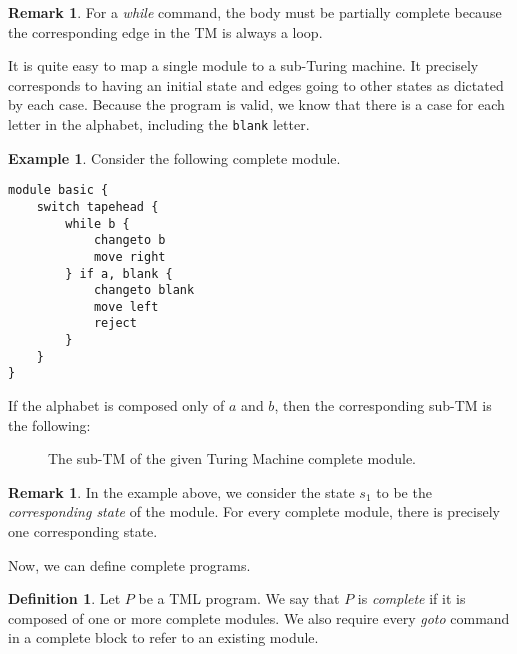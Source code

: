 \documentclass{article}
\theoremstyle{definition}
\newtheorem{definition}[rules]{Definition}
\newtheorem{remark}[rules]{Remark}
\newtheorem{example}[rules]{Example}
\theoremstyle{plain}
\begin{document}
\begin{remark}
    For a \textit{while} command, the body must be partially complete because the corresponding edge in the TM is always a loop.
\end{remark}

It is quite easy to map a single module to a sub-Turing machine. It precisely corresponds to having an initial state and edges going to other states as dictated by each case. Because the program is valid, we know that there is a case for each letter in the alphabet, including the \texttt{blank} letter.
\begin{example}
    Consider the following complete module.
\begin{lstlisting}[language=TML]
module basic {
    switch tapehead {
        while b {
            changeto b
            move right
        } if a, blank {
            changeto blank
            move left
            reject
        }
    }
}
\end{lstlisting}
If the alphabet is composed only of $a$ and $b$, then the corresponding sub-TM is the following:
\begin{figure}[H]
    \centering
    \caption{The sub-TM of the given Turing Machine complete module.}
\end{figure}
\end{example}

\begin{remark}
    In the example above, we consider the state $s_1$ to be the \emph{corresponding state} of the module. For every complete module, there is precisely one corresponding state.
\end{remark}

Now, we can define complete programs.
\begin{definition}
    Let $P$ be a TML program. We say that $P$ is \emph{complete} if it is composed of one or more complete modules. We also require every \textit{goto} command in a complete block to refer to an existing module.
\end{definition}
\end{document}
